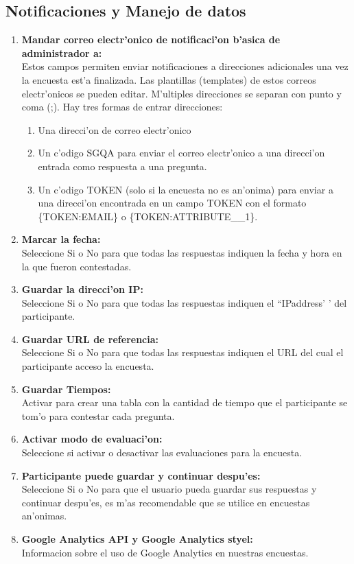\documentclass[12pt,spanish]{report}
\begin{document}
\subsection {Notificaciones y Manejo de datos}

	\begin{enumerate}
		\item {\bf Mandar correo electr'onico de notificaci'on b'asica de administrador a:} \\
		Estos campos permiten enviar notificaciones a direcciones adicionales una vez la encuesta est'a finalizada. Las plantillas (templates) de estos correos electr'onicos se pueden editar. M'ultiples direcciones se separan con punto y coma (;). Hay tres formas de entrar direcciones:
		\begin{enumerate}
			\item Una direcci'on de correo electr'onico
			\item Un c'odigo SGQA para enviar el correo electr'onico a una direcci'on entrada como respuesta a una pregunta.
			\item Un c'odigo TOKEN (solo si la encuesta no es an'onima) para enviar a una direcci'on encontrada en un campo TOKEN con el formato \{TOKEN:EMAIL\} o \{TOKEN:ATTRIBUTE\_\_1\}.
		\end{enumerate}
		\item {\bf Marcar la fecha: }\\
			Seleccione Si o No para que todas las respuestas indiquen la fecha y hora en la que fueron contestadas.
		\item {\bf Guardar  la direcci'on IP: }\\
			Seleccione Si o No para que todas las respuestas indiquen el ``IPaddress' ' del participante.
		\item {\bf Guardar URL de referencia: }\\
			Seleccione Si o No para que todas las respuestas indiquen el URL del cual el participante acceso la encuesta.
		\item {\bf Guardar Tiempos: }\\
			Activar para crear una tabla con la cantidad de tiempo que el participante se tom'o para contestar cada pregunta.
		\item {\bf Activar modo de evaluaci'on: }\\
			Seleccione si activar o desactivar las evaluaciones para la encuesta.
		\item {\bf Participante puede guardar y continuar despu'es: }\\
			Seleccione Si o No para que el usuario pueda guardar sus respuestas y continuar despu'es, es m'as recomendable que se utilice en encuestas an'onimas.
		\item {\bf Google Analytics API  y Google Analytics styel: }\\
			Informacion sobre el uso de Google Analytics en nuestras encuestas.
	\end{enumerate}
\end{document}
